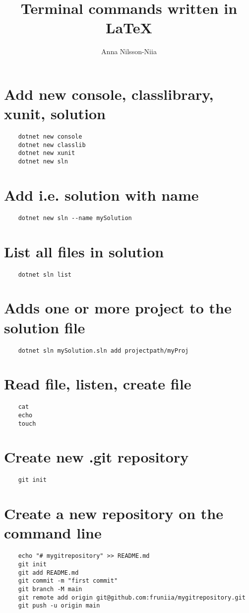 \documentclass[10pt, a4paper]{article}
\title{Terminal commands written in \LaTeX}
\author{Anna Nilsson-Niia}
\begin{document}
\maketitle
\section*{Add new console, classlibrary, xunit, solution}
\begin{verbatim}
    dotnet new console
    dotnet new classlib
    dotnet new xunit
    dotnet new sln
\end{verbatim}
\section*{Add i.e. solution with name}
\begin{verbatim}
    dotnet new sln --name mySolution
\end{verbatim}
\section*{List all files in solution}
\begin{verbatim}
    dotnet sln list
\end{verbatim}
\section*{Adds one or more project to the solution file}
\begin{verbatim}
    dotnet sln mySolution.sln add projectpath/myProj
\end{verbatim}
\section*{Read file, listen, create file}
\begin{verbatim}
    cat 
    echo 
    touch
\end{verbatim}
\section*{Create new .git repository}
\begin{verbatim}
    git init
\end{verbatim}
\section*{Create a new repository on the command line}
\begin{verbatim}
    echo "# mygitrepository" >> README.md
    git init
    git add README.md
    git commit -m "first commit"
    git branch -M main
    git remote add origin git@github.com:fruniia/mygitrepository.git
    git push -u origin main
\end{verbatim}
\end{document}
